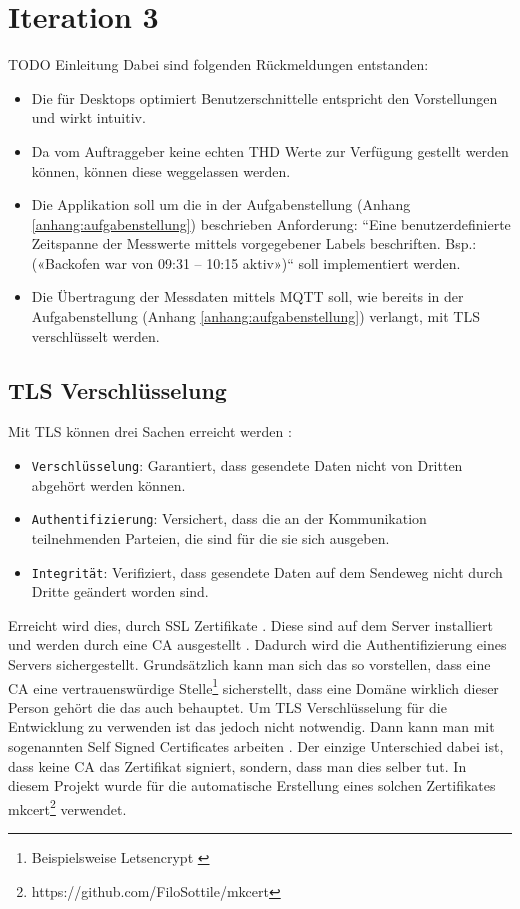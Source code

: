 \section{Iteration 3}
TODO Einleitung
Dabei sind folgenden Rückmeldungen entstanden:
\begin{itemize}
    \item Die für Desktops optimiert Benutzerschnittelle entspricht den Vorstellungen und wirkt intuitiv.
    \item Da vom Auftraggeber keine echten \ac{THD} Werte zur Verfügung gestellt werden können,
    können diese weggelassen werden.
    \item Die Applikation soll um die in der Aufgabenstellung (Anhang \ref{anhang:aufgabenstellung}) beschrieben Anforderung:
    ``Eine benutzerdefinierte Zeitspanne der Messwerte mittels vorgegebener
    Labels beschriften. Bsp.: («Backofen war von 09:31 – 10:15 aktiv»)`` soll implementiert werden.
    \item Die Übertragung der Messdaten mittels \ac{MQTT} soll,
     wie bereits in der Aufgabenstellung (Anhang \ref{anhang:aufgabenstellung}) verlangt, mit \ac{TLS} verschlüsselt werden.
\end{itemize}

\subsection{\ac{TLS} Verschlüsselung}

Mit \ac{TLS} können drei Sachen erreicht werden \parencite{what_is_tls}:

\begin{itemize}
    \item \texttt{Verschlüsselung}: Garantiert, dass gesendete Daten nicht von Dritten abgehört werden können.
    \item \texttt{Authentifizierung}: Versichert, dass die an der Kommunikation teilnehmenden Parteien, die sind für die sie sich ausgeben.
    \item \texttt{Integrität}: Verifiziert, dass gesendete Daten auf dem Sendeweg nicht durch Dritte geändert worden sind.
\end{itemize}

Erreicht wird dies, durch SSL Zertifikate \parencite{what_is_ssl_certificate}. Diese sind auf dem Server
installiert und werden durch eine \ac{CA} ausgestellt \parencite{what_is_ca}.
Dadurch wird die Authentifizierung eines Servers sichergestellt. Grundsätzlich kann man sich das
so vorstellen, dass eine \ac{CA} eine vertrauenswürdige Stelle\footnote{
    Beispielsweise Letsencrypt \parencite{letsencrypt_2021}
} sicherstellt, dass eine Domäne wirklich dieser Person gehört die das auch behauptet.
Um \ac{TLS} Verschlüsselung für die Entwicklung zu verwenden ist das jedoch nicht notwendig.
Dann kann man mit sogenannten Self Signed Certificates arbeiten \parencite{self_signed_cert}.
Der einzige Unterschied dabei ist, dass keine \ac{CA} das Zertifikat signiert, sondern, dass man
dies selber tut. In diesem Projekt wurde für die automatische Erstellung eines solchen
Zertifikates mkcert\footnote{https://github.com/FiloSottile/mkcert} verwendet.

